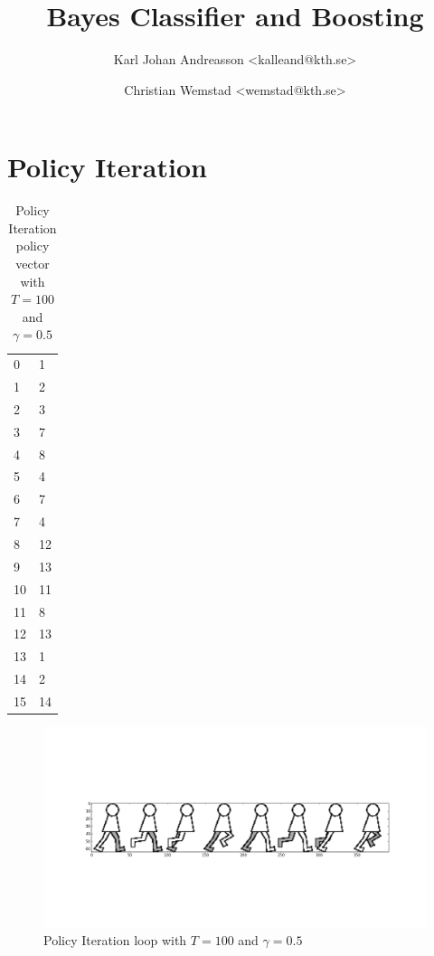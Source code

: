 \documentclass[a4paper]{article}
\title{Bayes Classifier and Boosting}
\author{Karl Johan Andreasson <{kalleand@kth.se}> %
\and Christian Wemstad <{wemstad@kth.se}> %
}
\begin{document}
\thispagestyle{empty}
\maketitle
\thispagestyle{empty}
\pagestyle{empty}
\newpage
\pagestyle{fancy}
\setcounter{page}{1}

\section{Policy Iteration}

\begin{table}[h!]
    \centering
    \begin{tabular}{l|l}
        0 & 1 \\
        1 & 2 \\
        2 & 3 \\
        3 & 7 \\
        4 & 8 \\
        5 & 4 \\
        6 & 7 \\
        7 & 4 \\
        8 & 12 \\
        9 & 13 \\
        10 & 11 \\
        11 & 8 \\
        12 & 13 \\
        13 & 1 \\
        14 & 2 \\
        15 & 14 \\
    \end{tabular}
    \caption{Policy Iteration policy vector with $T = 100$ and $\gamma = 0.5$}
\end{table}

\begin{figure}[h!]
    \centering
    \includegraphics[width=1\textwidth]{qlearning1.png}
    \caption{Policy Iteration loop with $T = 100$ and $\gamma = 0.5$}
\end{figure}
\end{document}
